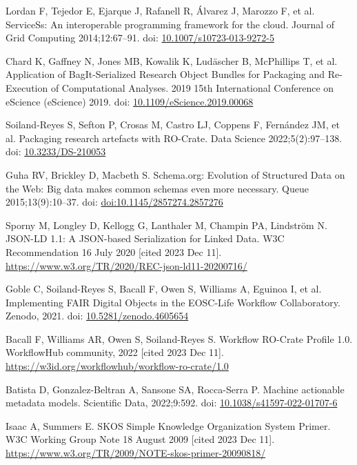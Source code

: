\documentclass[10pt,letterpaper]{article}
\begin{document}
\begin{thebibliography}{10}
\begin{small}
Lordan F, Tejedor E, Ejarque J, Rafanell R, Álvarez J, Marozzo F, et al.
ServiceSs: An interoperable programming framework for the cloud.
Journal of Grid Computing 2014;12:67--91.
doi: \href{https://doi.org/10.1007/s10723-013-9272-5}{10.1007/s10723-013-9272-5}

Chard K, Gaffney N, Jones MB, Kowalik K, Ludäscher B, McPhillips T, et al.
Application of BagIt-Serialized Research Object Bundles for Packaging and Re-Execution of Computational Analyses.
2019 15th International Conference on eScience (eScience) 2019.
doi: \href{https://doi.org/10.1109/eScience.2019.00068}{10.1109/eScience.2019.00068}

Soiland-Reyes S, Sefton P, Crosas M, Castro LJ, Coppens F, Fernández JM, et al.
Packaging research artefacts with RO-Crate.
Data Science 2022;5(2):97--138.
doi: \href{https://doi.org/10.3233/DS-210053}{10.3233/DS-210053}

Guha RV, Brickley D, Macbeth S.
Schema.org: Evolution of Structured Data on the Web: Big data makes common schemas even more necessary.
Queue 2015;13(9):10--37.
doi: \href{https://doi.org/doi:10.1145/2857274.2857276}{doi:10.1145/2857274.2857276}

Sporny M, Longley D, Kellogg G, Lanthaler M, Champin PA, Lindström N.
JSON-LD 1.1: A JSON-based Serialization for Linked Data.
W3C Recommendation 16 July 2020 [cited 2023 Dec 11].
\url{https://www.w3.org/TR/2020/REC-json-ld11-20200716/}

Goble C, Soiland-Reyes S, Bacall F, Owen S, Williams A, Eguinoa I, et al.
Implementing FAIR Digital Objects in the EOSC-Life Workflow Collaboratory.
Zenodo, 2021.
doi: \href{https://doi.org/10.5281/zenodo.4605654}{10.5281/zenodo.4605654}

Bacall F, Williams AR, Owen S, Soiland-Reyes S.
Workflow RO-Crate Profile 1.0.
WorkflowHub community, 2022 [cited 2023 Dec 11].
\url{https://w3id.org/workflowhub/workflow-ro-crate/1.0}

Batista D, Gonzalez-Beltran A, Sansone SA, Rocca-Serra P.
Machine actionable metadata models.
Scientific Data, 2022;9:592.
doi: \href{https://doi.org/10.1038/s41597-022-01707-6}{10.1038/s41597-022-01707-6}

Isaac A, Summers E.
SKOS Simple Knowledge Organization System Primer.
W3C Working Group Note 18 August 2009 [cited 2023 Dec 11].
\url{https://www.w3.org/TR/2009/NOTE-skos-primer-20090818/}


\end{small}
\end{thebibliography}
\end{document}
